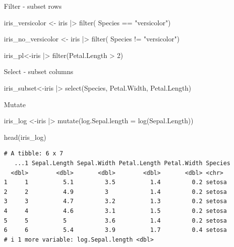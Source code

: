 \documentclass[
  ignorenonframetext,
  aspectratio=169,
]{beamer}
\newenvironment{Shaded}{\begin{snugshade}}{\end{snugshade}}
\newcommand{\AttributeTok}[1]{\textcolor[rgb]{0.40,0.45,0.13}{#1}}
\newcommand{\DecValTok}[1]{\textcolor[rgb]{0.68,0.00,0.00}{#1}}
\newcommand{\FunctionTok}[1]{\textcolor[rgb]{0.28,0.35,0.67}{#1}}
\newcommand{\NormalTok}[1]{\textcolor[rgb]{0.00,0.23,0.31}{#1}}
\newcommand{\OtherTok}[1]{\textcolor[rgb]{0.00,0.23,0.31}{#1}}
\newcommand{\SpecialCharTok}[1]{\textcolor[rgb]{0.37,0.37,0.37}{#1}}
\newcommand{\StringTok}[1]{\textcolor[rgb]{0.13,0.47,0.30}{#1}}
\begin{document}
\begin{frame}[fragile]{Filter - subset rows}
\label{filter---subset-rows}
\begin{Shaded}
\begin{Highlighting}[]
\NormalTok{iris\_versicolor }\OtherTok{\textless{}{-}}\NormalTok{ iris }\SpecialCharTok{|\textgreater{}}  \FunctionTok{filter}\NormalTok{( Species }\SpecialCharTok{==} \StringTok{"versicolor"}\NormalTok{)}

\NormalTok{iris\_no\_versicolor }\OtherTok{\textless{}{-}}\NormalTok{ iris }\SpecialCharTok{|\textgreater{}}  \FunctionTok{filter}\NormalTok{( Species }\SpecialCharTok{!=} \StringTok{"versicolor"}\NormalTok{)}

\NormalTok{iris\_pl}\OtherTok{\textless{}{-}}\NormalTok{iris }\SpecialCharTok{|\textgreater{}}  \FunctionTok{filter}\NormalTok{(Petal.Length }\SpecialCharTok{\textgreater{}} \DecValTok{2}\NormalTok{)}
\end{Highlighting}
\end{Shaded}
\end{frame}

\begin{frame}[fragile]{Select - subset columns}
\label{select---subset-columns}
\begin{Shaded}
\begin{Highlighting}[]
\NormalTok{iris\_subset}\OtherTok{\textless{}{-}}\NormalTok{iris }\SpecialCharTok{|\textgreater{}} \FunctionTok{select}\NormalTok{(Species, Petal.Width, Petal.Length)}
\end{Highlighting}
\end{Shaded}
\end{frame}

\begin{frame}[fragile]{Mutate}
\label{mutate}
\begin{Shaded}
\begin{Highlighting}[]
\NormalTok{iris\_log }\OtherTok{\textless{}{-}}\NormalTok{iris }\SpecialCharTok{|\textgreater{}} \FunctionTok{mutate}\NormalTok{(}\AttributeTok{log.Sepal.length =} \FunctionTok{log}\NormalTok{(Sepal.Length))}

\FunctionTok{head}\NormalTok{(iris\_log)}
\end{Highlighting}
\end{Shaded}

\begin{verbatim}
# A tibble: 6 x 7
   ...1 Sepal.Length Sepal.Width Petal.Length Petal.Width Species
  <dbl>        <dbl>       <dbl>        <dbl>       <dbl> <chr>  
1     1          5.1         3.5          1.4         0.2 setosa 
2     2          4.9         3            1.4         0.2 setosa 
3     3          4.7         3.2          1.3         0.2 setosa 
4     4          4.6         3.1          1.5         0.2 setosa 
5     5          5           3.6          1.4         0.2 setosa 
6     6          5.4         3.9          1.7         0.4 setosa 
# i 1 more variable: log.Sepal.length <dbl>
\end{verbatim}
\end{frame}
\end{document}
